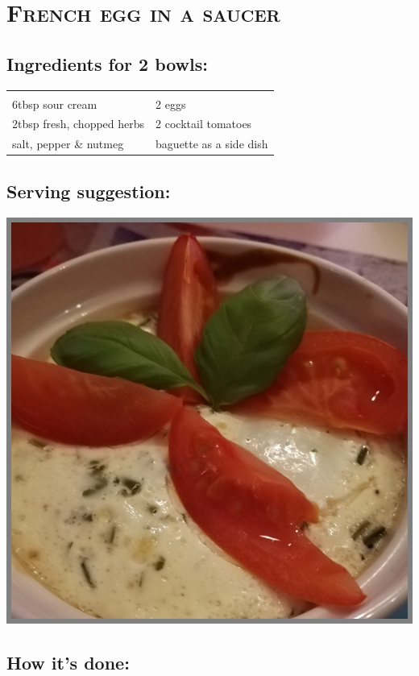 \section{\textsc{French egg in a saucer}}

\subsection*{Ingredients for 2 bowls:}

\begin{tabular}{p{7.5cm} p{7.5cm}}
	& \\
	6tbsp sour cream & 2 eggs \\
	2tbsp fresh, chopped herbs  & 2 cocktail tomatoes \\
  salt, pepper \& nutmeg & baguette as a side dish
\end{tabular}

\subsection*{Serving suggestion:}

\includegraphics[width=\textwidth]{img/ei_naepfchen.jpg} \cite{eiimnaepfchen}

\subsection*{How it's done:}

